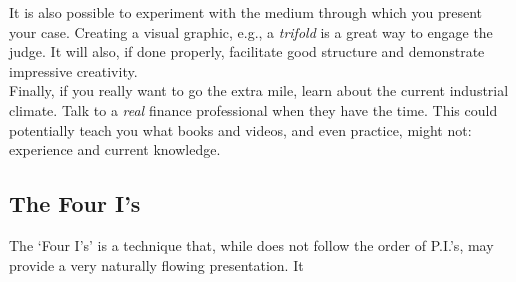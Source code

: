 \documentclass[12pt]{article}
\begin{document}
It is also possible to experiment with the medium through which you present your case. Creating a visual graphic, e.g., a \textit{trifold} is a great way to engage the judge. It will also, if done properly, facilitate good structure and demonstrate impressive creativity. \\

Finally, if you really want to go the extra mile, learn about the current industrial climate. Talk to a \textit{real} finance professional when they have the time. This could potentially teach you what books and videos, and even practice, might not: experience and current knowledge.

\subsection{The Four I's}

The \lq Four I's' is a technique that, while does not follow the order of P.I.'s, may provide a very naturally flowing presentation. It 
\end{document}
